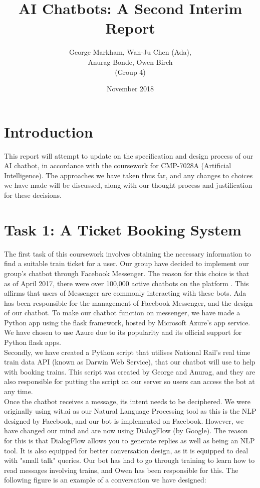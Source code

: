\documentclass[12pt,a4paper]{article}
\title{AI Chatbots: A Second Interim Report}
\author{George Markham, Wan-Ju Chen (Ada), \\ Anurag Bonde, Owen Birch \\ (Group 4)} %
\date{November 2018}
\begin{document}
    \maketitle

    \section*{Introduction}
    
    This report will attempt to update on the specification and design process of our AI chatbot, in accordance with the coursework for CMP-7028A (Artificial Intelligence). The approaches we have taken thus far, and any changes to choices we have made will be discussed, along with our thought process and justification for these decisions.
    
    \section*{Task 1: A Ticket Booking System}
    The first task of this coursework involves obtaining the necessary information to find a suitable train ticket for a user. Our group have decided to implement our group's chatbot through Facebook Messenger. The reason for this choice is that as of April 2017, there were over 100,000 active chatbots on the platform \citep{Parr17}. This affirms that users of Messenger are commonly interacting with these bots. Ada has been responsible for the management of Facebook Messenger, and the design of our chatbot. To make our chatbot function on messenger, we have made a Python app using the flask framework, hosted by Microsoft Azure's app service. We have chosen to use Azure due to its popularity and its official support for Python flask apps.  \\
    
    Secondly, we have created a Python script that utilises National Rail's real time train data API (known as Darwin Web Service), that our chatbot will use to help with booking trains. This script was created by George and Anurag, and they are also responsible for putting the script on our server so users can access the bot at any time. \\
    
    Once the chatbot receives a message, its intent needs to be deciphered. We were originally using wit.ai as our Natural Language Processing tool as this is the NLP designed by Facebook, and our bot is implemented on Facebook. However, we have changed our mind and are now using DialogFlow (by Google). The reason for this is that DialogFlow allows you to generate replies as well as being an NLP tool. It is also equipped for better conversation design, as it is equipped to deal with "small talk" queries. Our bot has had to go through training to learn how to read messages involving trains, and Owen has been responsible for this. The following figure is an example of a conversation we have designed:
    
\end{document}
